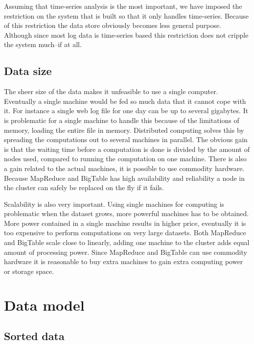 \documentclass[a4paper,10pt]{book}
\begin{document}
Assuming that time-series analysis is the most important, we have imposed
the restriction on the system that is built so that it only handles
time-series. Because of this restriction the data store obviously becomes
less general purpose. Although since most log data is time-series based
this restriction does not cripple the system much--if at all.



\section{Data size}

The sheer size of the data makes it unfeasible to use a single computer.
Eventually a single machine would be fed so much data that it cannot cope
with it. For instance a single web log file for one day can be up to
several gigabytes. It is problematic for a single machine to handle this
because of the limitations of memory, loading the entire file in memory.
Distributed computing solves this by spreading the computations out to
several machines in parallel. The obvious gain is that the waiting time
before a computation is done is divided by the amount of nodes used,
compared to running the computation on one machine. There is also a gain
related to the actual machines, it is possible to use commodity hardware.
Because MapReduce and BigTable has high availability and reliability a node
in the cluster can safely be replaced on the fly if it fails.

Scalability is also very important. Using single machines for computing is
problematic when the dataset grows, more powerful machines has to be
obtained. More power contained in a single machine results in higher price,
eventually it is too expensive to perform computations on very large
datasets. Both MapReduce and BigTable scale close to linearly, adding one
machine to the cluster adds equal amount of processing power. Since
MapReduce and BigTable can use commodity hardware it is reasonable to buy
extra machines to gain extra computing power or storage space.



\chapter{Data model}

\section{Sorted data}
\end{document}
